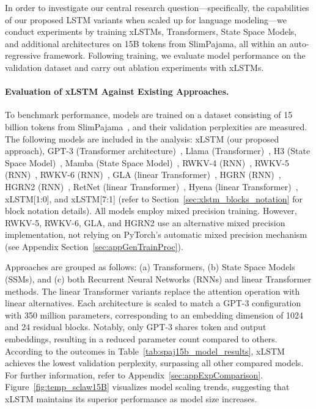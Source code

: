 In order to investigate our central research question—specifically, the capabilities of our proposed LSTM variants when scaled up for language modeling—we conduct experiments by training xLSTMs, Transformers, State Space Models, and additional architectures on 15B tokens from SlimPajama, all within an auto-regressive framework. Following training, we evaluate model performance on the validation dataset and carry out ablation experiments with xLSTMs.

\paragraph{Evaluation of xLSTM Against Existing Approaches.} To benchmark performance, models are trained on a dataset consisting of 15 billion tokens from SlimPajama~\citep{Soboleva:23}, and their validation perplexities are measured. The following models are included in the analysis: xLSTM (our proposed approach), GPT-3 (Transformer architecture)~\citep{Brown:20short}, Llama (Transformer)~\citep{Touvron:23arxiv}, H3 (State Space Model)~\citep{Fu:23}, Mamba (State Space Model)~\citep{Gu:24arxiv}, RWKV-4 (RNN)~\citep{Peng:23arxivshort}, RWKV-5 (RNN)~\citep{Peng:24arxivshort}, RWKV-6 (RNN)~\citep{Peng:24arxivshort}, GLA (linear Transformer)~\citep{Yang:23arxiv}, HGRN (RNN)~\citep{Qin:23}, HGRN2 (RNN)~\citep{Qin:24arxiv}, RetNet (linear Transformer)~\citep{Sun:23arxiv}, Hyena (linear Transformer)~\citep{Poli:23}, xLSTM[1:0], and xLSTM[7:1] (refer to Section~\ref{sec:xlstm_blocks_notation} for block notation details). All models employ mixed precision training. However, RWKV-5, RWKV-6, GLA, and HGRN2 use an alternative mixed precision implementation, not relying on PyTorch’s automatic mixed precision mechanism (see Appendix Section~\ref{sec:appGenTrainProc}). 

Approaches are grouped as follows: (a) Transformers, (b) State Space Models (SSMs), and (c) both Recurrent Neural Networks (RNNs) and linear Transformer methods. The linear Transformer variants replace the attention operation with linear alternatives. Each architecture is scaled to match a GPT-3 configuration with 350 million parameters, corresponding to an embedding dimension of 1024 and 24 residual blocks. Notably, only GPT-3 shares token and output embeddings, resulting in a reduced parameter count compared to others. According to the outcomes in Table~\ref{tab:spaj15b_model_results}, xLSTM achieves the lowest validation perplexity, surpassing all other compared models. For further information, refer to Appendix~\ref{sec:appExpComparison}. Figure~\ref{fig:temp_sclaw15B} visualizes model scaling trends, suggesting that xLSTM maintains its superior performance as model size increases.

